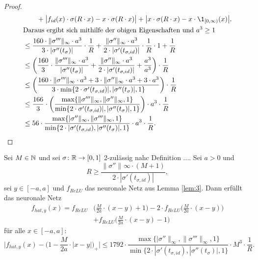 \begin{proof}
\begin{equation*}
\begin{split}
& \qquad + \big| f_{id}(x)\cdot\sigma(R \cdot x) - x \cdot \sigma(R \cdot x)\big| + \big| x \cdot \sigma(R \cdot x) - x \cdot \1_{[0, \infty)}(x)\big|. \\
& \text{Daraus ergibt sich mithilfe der obigen Eigenschaften und $a^3 \geq 1$}\\
& \leq \frac{160 \cdot \|\sigma'''\|_{\infty} \cdot a ^3}{3 \cdot |\sigma''(t_{\sigma})|} \cdot \frac{1}{R} + \frac{\|\sigma''\|_{\infty} \cdot a^3}{2 \cdot |\sigma'(t_{\sigma, id})|} \cdot \frac{1}{R} \cdot 1+ \frac{1}{R} \\
& \leq \bigg(\frac{160}{3} \cdot \frac{\|\sigma'''\|_{\infty} \cdot a ^3}{|\sigma''(t_{\sigma})|} + \frac{\|\sigma''\|_{\infty} \cdot a^3}{2 \cdot |\sigma'(t_{\sigma, id})|} + \frac{a^3}{a^3} \bigg) \cdot \frac{1}{R} \\ 
& \leq \bigg(\frac{160 \cdot\|\sigma'''\|_{\infty} \cdot a ^3 + 3 \cdot \|\sigma''\|_{\infty} \cdot a^3 + 3 \cdot a^3}{3 \cdot \min\{ 2 \cdot \sigma'(t_{\sigma, id})|, |\sigma''(t_{\sigma})|, 1\}}\bigg) \cdot \frac{1}{R}\\
& \leq \frac{166}{3} \cdot \bigg(\frac{\max\{\|\sigma'''\|_{\infty}, \|\sigma''\|_{\infty} , 1\}}{\min\{ 2 \cdot \sigma'(t_{\sigma, id})|, |\sigma''(t_{\sigma})|, 1\}}\bigg) \cdot a^3 \cdot  \frac{1}{R} \\
& \leq 56 \cdot \frac{\max\{|\sigma''\|_{\infty}, \|\sigma'''\|_{\infty}, 1\}}{\min\{2 \cdot |\sigma'(t_{\sigma, id}), |\sigma''(t_{\sigma})|, 1\}} \cdot a^3 \cdot \frac{1}{R}.
\end{split}
\end{equation*}
  \end{proof}
  \begin{lem}
  \label{lem:4}
  Sei $M \in \mathbb{N}$ und sei $\sigma\colon \mathbb{R} \to [0, 1]$ 2-zulässig nahc Definition .... Sei $a > 0$ und $$R \geq \frac{\|\sigma''\|_{}\infty \cdot (M + 1)}{2 \cdot |\sigma'(t_{\sigma, id})|},$$ sei $y \in [-a, a]$ und $f_{ReLU}$ das neuronale Netz aus Lemma \ref{lem:3}. Dann erfüllt das neuronale Netz 
  \begin{equation*}
  \begin{split}
  f_{hat,y}(x) = f_{ReLU}& \bigg(\frac{M}{2a} \cdot (x - y) + 1\bigg) - 2 \cdot f_{ReLU}\bigg(\frac{M}{2a} \cdot (x - y)\bigg) \\ &+ f_{ReLU}\bigg(\frac{M}{2a} \cdot (x - y) - 1\bigg)
  \end{split}
  \end{equation*}
  für alle $x \in [-a ,a]\colon$ 
  $$\bigg|f_{hat,y}(x) - \bigg(1 - \frac{M}{2a} \cdot |x - y|\bigg)_+\bigg| \leq 1792 \cdot \frac{\max\{|\sigma''\|_{\infty}, \|\sigma'''\|_{\infty}, 1\}}{\min\{2 \cdot |\sigma'(t_{\sigma, id}), |\sigma''(t_{\sigma})|, 1\}} \cdot M^3 \cdot \frac{1}{R}.$$
  \end{lem}
